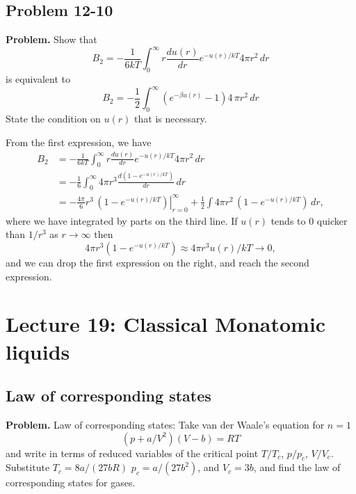 \documentclass[twocolumn, 10pt]{article}
\numberwithin{equation}{section}
\newenvironment{problem}
{\par\medskip\sffamily \color{problue}
  \textbf{Problem. }\ignorespaces}
{\medskip}
\newenvironment{solution}[1][\empty]
{\par\medskip
  \textbf{\ifx\empty#1{Solution.}\relax\else{#1}\fi} \ignorespaces}
{\medskip}
\begin{document}
\subsection{Problem 12-10}

\begin{problem}
  Show that
  $$
  B_2 =
  -\frac{1}{6kT}
  \int_0^\infty
  r \frac{ du(r) } { dr } e^{-u(r)/kT} 4 \pi r^2 \, dr
  $$
  is equivalent to
  $$
  B_2
  =
  -\frac{1}{2}
  \int_0^\infty
  (e^{-\beta u(r)} - 1)
  4 \, \pi r^2 \, dr
  $$
  State the condition on $u(r)$ that is necessary.
\end{problem}

\begin{solution}
  From the first expression, we have
  \begin{align*}
  B_2 &=
  -\frac{1}{6kT}
  \int_0^\infty
  r \frac{ du(r) } { dr } e^{-u(r)/kT} 4 \pi r^2 \, dr
  \\
    &=
  -\frac{1}{6}
  \int_0^\infty
    4 \pi r^3 \frac{ d(1- e^{-u(r)/kT}) } { dr } \, dr
  \\
  &=
  \left.
    -\frac{ 4 \pi }{6} r^3 \, (1- e^{-u(r)/kT})
  \right|_{r=0}^{\infty}
  +
  \frac{1}{2}
  \int 4 \pi r^2 \, (1- e^{-u(r)/kT}) \, dr
  ,
  \end{align*}
  where we have integrated by parts on the third line.
  If $u(r)$ tends to $0$ quicker than $1/r^3$ as $r \to \infty$
  then
  $$
  4\pi r^3 (1 - e^{-u(r)/kT}) \approx 4 \pi r^3 u(r)/kT \to 0,
  $$
  and we can drop the first expression on the right,
  and reach the second expression.
\end{solution}

\section{Lecture 19: Classical Monatomic liquids}

\subsection{Law of corresponding states}

\begin{problem}
Law of corresponding states: Take van der Waale's
equation for $n = 1$
$$
\left( p + a/V^2 \right)(V - b) = RT
$$
and write in terms of reduced variables of
the critical point $T/T_c$, $p/p_c$, $V/V_c$.
%
Substitute
  $T_c = 8a/(27bR)$
  $p_c = a/(27b^2)$,
  and
  $V_c = 3b$, 
and find the law of corresponding states for gases.
\end{problem}
\end{document}
